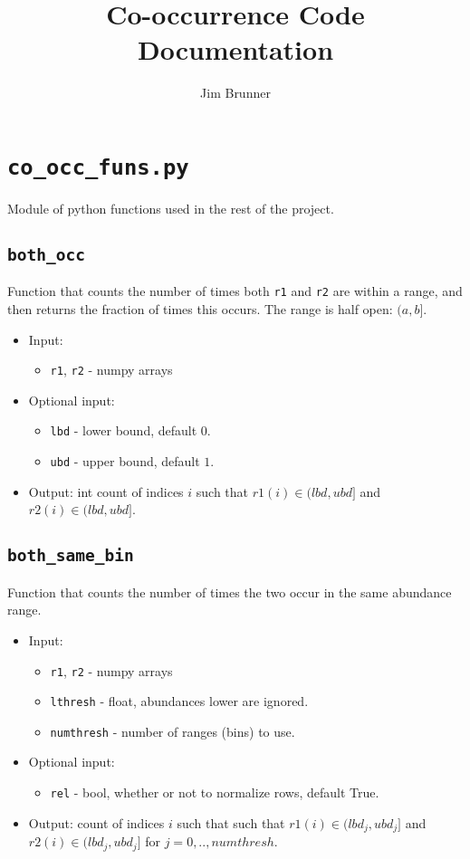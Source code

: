 \documentclass[10pt]{article}
\author{Jim Brunner}
\title{Co-occurrence Code Documentation}
\theoremstyle{definition}
\numberwithin{theorem}{section}
\numberwithin{definition}{section}
\numberwithin{lemma}{section}
\numberwithin{corollary}{section}
\numberwithin{clm}{section}
\numberwithin{rmk}{section}
\begin{document}
\maketitle

\tableofcontents

\cprotect \section{\verb|co_occ_funs.py|}
Module of python functions used in the rest of the project.
\cprotect \subsection{\verb|both_occ|}
Function that counts the number of times both \verb|r1| and \verb|r2| are within a range, and then 
returns the fraction of times this occurs. The range is half open: $(a,b]$.
\begin{itemize}
	\item Input: \begin{itemize}
		\item \verb|r1|, \verb|r2| - numpy arrays
	\end{itemize}
	\item Optional input: 
	\begin{itemize}
		\item  \verb|lbd| - lower bound, default $0$.
		\item  \verb|ubd| - upper bound, default $1$.
	\end{itemize}
	\item Output: int count of indices $i$ such that $r1(i) \in (lbd, ubd]$ and $r2(i) \in (lbd, ubd]$.
\end{itemize}

\cprotect \subsection{\verb|both_same_bin|}
Function that counts the number of times the two occur in the same abundance range.
\begin{itemize}
	\item Input: 
	\begin{itemize}
		\item \verb|r1|, \verb|r2| -  numpy arrays
		\item \verb|lthresh| - float, abundances lower are ignored.
		\item \verb|numthresh| - number of ranges (bins) to use.
	\end{itemize}
	\item Optional input:
	\begin{itemize}
		\item \verb|rel| - bool, whether or not to normalize rows, default True.
	\end{itemize}
	\item Output: count of indices $i$ such that such that $r1(i) \in (lbd_j, ubd_j]$ and $r2(i) \in (lbd_j, ubd_j]$ for $j = 0,..,numthresh$.
\end{itemize}
\end{document}
